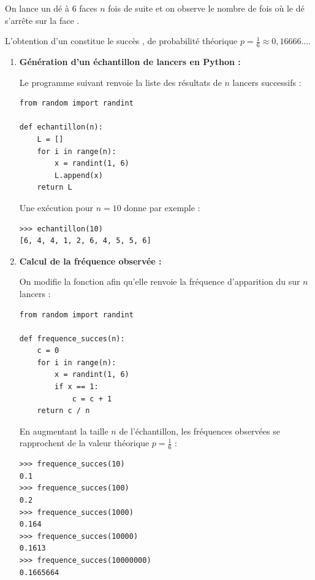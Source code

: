 \begin{ex}
	On lance un dé à $6$ faces $n$ fois de suite et on observe le nombre de fois où le dé s'arrête sur la face .

	L'obtention d'un  constitue le \og succès \fg{}, de probabilité théorique $p = \frac{1}{6} \approx 0{,}16666\ldots$.

	\begin{enumerate}
		\item \textbf{Génération d'un échantillon de lancers en Python :}

		      Le programme suivant renvoie la liste des résultats de $n$ lancers successifs :

		      \begin{lstlisting}
from random import randint

def echantillon(n):
    L = []
    for i in range(n):
        x = randint(1, 6)
        L.append(x)
    return L
\end{lstlisting}

		      Une exécution pour $n = 10$ donne par exemple :
		      \begin{lstlisting}
>>> echantillon(10)
[6, 4, 4, 1, 2, 6, 4, 5, 5, 6]
\end{lstlisting}

		\item \textbf{Calcul de la fréquence observée :}

		      On modifie la fonction afin qu'elle renvoie la fréquence d'apparition du  sur $n$ lancers :

		      \begin{lstlisting}
from random import randint

def frequence_succes(n):
    c = 0
    for i in range(n):
        x = randint(1, 6)
        if x == 1:
            c = c + 1
    return c / n
\end{lstlisting}

		      \newpage

		      En augmentant la taille $n$ de l'échantillon, les fréquences observées se rapprochent de la valeur théorique $p = \frac{1}{6}$ :
		      \begin{lstlisting}
>>> frequence_succes(10)
0.1
>>> frequence_succes(100)
0.2
>>> frequence_succes(1000)
0.164
>>> frequence_succes(10000)
0.1613
>>> frequence_succes(10000000)
0.1665664
\end{lstlisting}
	\end{enumerate}
\end{ex}

